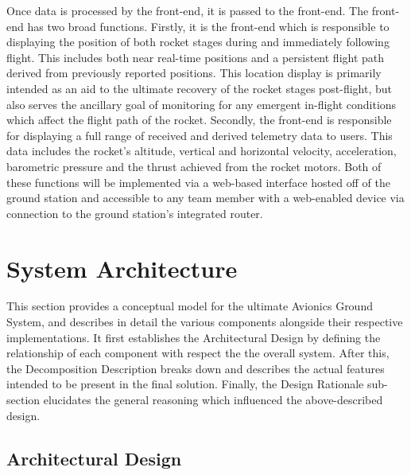 \documentclass[journal,10pt,onecolumn,compsoc]{IEEEtran}
\begin{document}
	\noindent Once data is processed by the front-end, it is passed to the front-end.
	The front-end has two broad functions.
	Firstly, it is the front-end which is responsible to displaying the position of both rocket stages during and immediately following flight.
	This includes both near real-time positions and a persistent flight path derived from previously reported positions.
	This location display is primarily intended as an aid to the ultimate recovery of the rocket stages post-flight, but also serves the ancillary goal of monitoring for any emergent in-flight conditions which affect the flight path of the rocket.
	Secondly, the front-end is responsible for displaying a full range of received and derived telemetry data to users.
	This data includes the rocket’s altitude, vertical and horizontal velocity, acceleration, barometric pressure and the thrust achieved from the rocket motors.
	Both of these functions will be implemented via a web-based interface hosted off of the ground station and accessible to any team member with a web-enabled device via connection to the ground station's integrated router. 

	

\section{System Architecture}
	\noindent This section provides a conceptual model for the ultimate Avionics Ground System, and describes in detail the various components alongside their respective implementations.
	It first establishes the Architectural Design by defining the relationship of each component with respect the the overall system.
	After this, the Decomposition Description breaks down and describes the actual features intended to be present in the final solution.
	Finally, the Design Rationale sub-section elucidates the general reasoning which influenced the above-described design.

	\subsection{Architectural Design}

\end{document}
